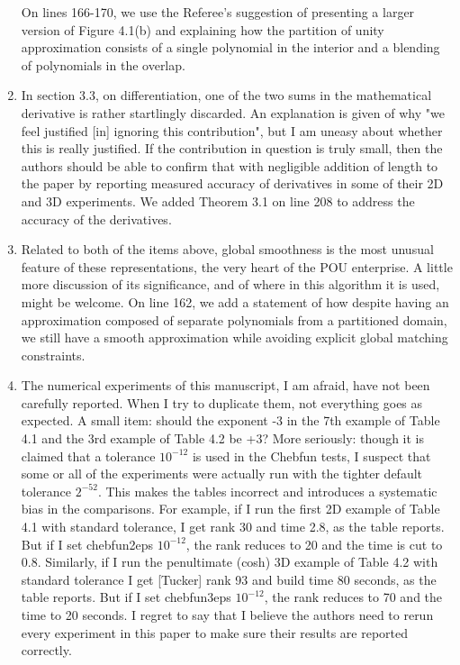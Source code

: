 \documentclass[10pt]{article}
\begin{document}
\begin{enumerate}
\begin{response}
On lines 166-170, we use the Referee's suggestion of presenting a larger version of Figure 4.1(b) and explaining how the partition of unity approximation consists of a single polynomial in the interior and a blending of polynomials in the overlap.
\end{response}

\item \begin{response}{In section 3.3, on differentiation, one of the
two sums in the mathematical derivative is rather
startlingly discarded. An explanation is given of why
"we feel justified [in] ignoring this contribution",
but I am uneasy about whether this is really justified.
If the contribution in question is truly small, then the
authors should be able to confirm that with negligible
addition of length to the paper by reporting measured
accuracy of derivatives in some of their 2D and 3D
experiments.}
We added Theorem 3.1 on line 208 to address the accuracy of the derivatives.
\end{response}

\item \begin{response}{Related to both of the items above, global smoothness is the most unusual feature of these representations, the very heart of the POU enterprise. A little more discussion
of its significance, and of where in this algorithm it is
used, might be welcome.}
On line 162, we add a statement of how despite having an approximation composed of separate polynomials from a partitioned domain, we still have a smooth approximation while avoiding explicit global matching constraints.
\end{response}

\item \begin{response}{The numerical experiments of this manuscript, I am afraid, have not been carefully reported. When I try
to duplicate them, not everything goes as expected.
A small item: should the exponent -3 in the 7th example
of Table 4.1 and the 3rd example of Table 4.2 be +3?
More seriously: though it is claimed that a tolerance
$10^{-12}$ is used in the Chebfun tests, I suspect that some or
all of the experiments were actually run with the tighter
default tolerance $2^{-52}$. This makes the tables incorrect
and introduces a systematic bias in the comparisons.
For example, if I run the first 2D example of Table 4.1
with standard tolerance, I get rank 30 and time 2.8, as the
table reports. But if I set chebfun2eps $10^{-12}$, the rank
reduces to 20 and the time is cut to 0.8. Similarly, if
I run the penultimate (cosh) 3D example of Table 4.2 with
standard tolerance I get [Tucker] rank 93 and build time 80
seconds, as the table reports. But if I set chebfun3eps
$10^{-12}$, the rank reduces to 70 and the time to 20 seconds.
I regret to say that I believe the authors need to rerun
every experiment in this paper to make sure their results
are reported correctly.}


\end{response}
\end{enumerate}
\end{document}
